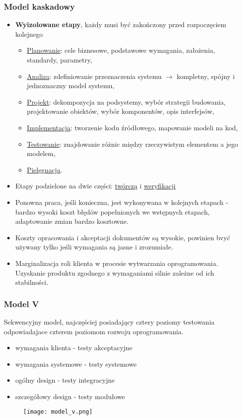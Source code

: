 \documentclass[../main.tex]{subfiles}
\begin{document}
    \subsubsection{Model kaskadowy}
    \begin{itemize}
        \item \textbf{Wyizolowane etapy}, każdy musi być zakończony przed rozpoczęciem kolejnego
        \begin{itemize}
            \item \underline{Planowanie}: cele biznesowe, podstawowe wymagania, założenia, standardy, parametry,
            \item \underline{Analiza}: zdefiniowanie przeznaczenia systemu $\rightarrow$ kompletny, spójny i jednoznaczny model systemu,
            \item \underline{Projekt}: dekompozycja na podsystemy, wybór strategii budowania, projektowanie obiektów, wybór komponentów, opis interfejsów,
            \item \underline{Implementacja}: tworzenie kodu źródłowego, mapowanie modeli na kod,
            \item \underline{Testowanie}: znajdowanie różnic między rzeczywistym elementem a jego modelem,
            \item \underline{Pielęgnacja}.
        \end{itemize}
        \item Etapy podzielone na dwie części: \underline{twórczą} i \underline{weryfikacji}
        \item Ponowna praca, jeśli konieczna, jest wykonywana w kolejnych etapach - bardzo wysoki koszt błędów
        popełnionych we wstępnych etapach, adaptowanie zmian bardzo kosztowne.
        \item Koszty opracowania i akceptacji dokumentów są wysokie, powinien bvyć używany
        tylko jeśli wymagania są jasne i zrozumiałe.
        \item Marginalizacja roli klienta w procesie wytwarzania oprogramowania. Uzyskanie produktu zgodnego z wymaganiami
        silnie zależne od ich stabilności.
    \end{itemize}

    \subsubsection{Model V}
    Sekwencyjny model, najczęściej posiadający cztery poziomy testowania odpowiadajace czterem poziomom rozwoju oprogramowania.
    \begin{itemize}
        \item wymagania klienta - testy akceptacyjne
        \item wymagania systemowe - testy systemowe
        \item ogólny design - testy integracyjne
        \item szczegółowy design - testy modułowe
    \end{itemize}
    \begin{figure}[H]
        \texttt{[image: model\_v.png]}
    \end{figure}
\end{document}
